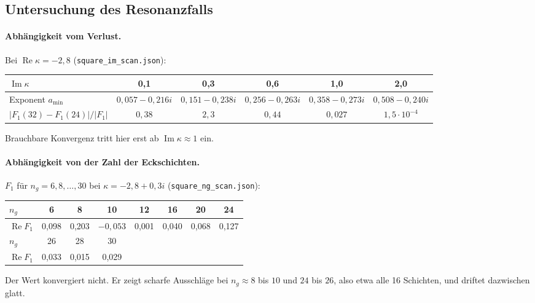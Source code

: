 \documentclass[11pt, a4paper]{article}
\theoremstyle{plain}
\theoremstyle{definition}
\begin{document}
\subsection{Untersuchung des Resonanzfalls}\label{sec:resonanz}

\paragraph{Abhängigkeit vom Verlust.} Bei $\operatorname{Re}\kappa=-2{,}8$
(\texttt{square\_im\_scan.json}):
\begin{center}\footnotesize\setlength{\tabcolsep}{3pt}
\begin{tabular}{lccccc}
\toprule
$\operatorname{Im}\kappa$ & 0,1 & 0,3 & 0,6 & 1,0 & 2,0\\
\midrule
Exponent $a_{\min}$ & $0{,}057-0{,}216i$ & $0{,}151-0{,}238i$ & $0{,}256-0{,}263i$ & $0{,}358-0{,}273i$ & $0{,}508-0{,}240i$\\
$|F_1(32)-F_1(24)|/|F_1|$ & $0{,}38$ & $2{,}3$ & $0{,}44$ & $0{,}027$ & $1{,}5\cdot10^{-4}$\\
\bottomrule
\end{tabular}
\end{center}
Brauchbare Konvergenz tritt hier erst ab $\operatorname{Im}\kappa\approx1$ ein.

\paragraph{Abhängigkeit von der Zahl der Eckschichten.} $F_1$ für
$n_g=6,8,\dots,30$ bei $\kappa=-2{,}8+0{,}3i$ (\texttt{square\_ng\_scan.json}):
\begin{center}\small
\begin{tabular}{lccccccc}
\toprule
$n_g$ & 6 & 8 & 10 & 12 & 16 & 20 & 24\\
\midrule
$\operatorname{Re}F_1$ & 0,098 & 0,203 & $-0{,}053$ & 0,001 & 0,040 & 0,068 & 0,127\\
\midrule
$n_g$ & 26 & 28 & 30\\
\cmidrule(r){1-4}
$\operatorname{Re}F_1$ & 0,033 & 0,015 & 0,029\\
\bottomrule
\end{tabular}
\end{center}
Der Wert konvergiert nicht. Er zeigt scharfe Ausschläge bei $n_g\approx8$ bis $10$
und $24$ bis $26$, also etwa alle 16 Schichten, und driftet dazwischen glatt.
\end{document}
